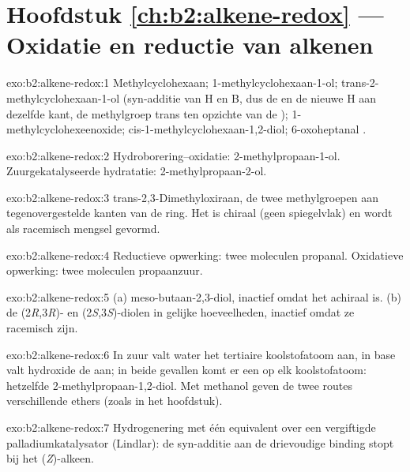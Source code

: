 \section*{Hoofdstuk \ref{ch:b2:alkene-redox} --- Oxidatie en reductie van alkenen}

\begin{solution}{exo:b2:alkene-redox:1}
Methylcyclohexaan; 1-methylcyclohexaan-1-ol; trans-2-methylcyclohexaan-1-ol (syn-additie van
H en B, dus de  en de nieuwe H aan dezelfde kant, de methylgroep trans ten opzichte van de );
1-methylcyclohexeenoxide; cis-1-methylcyclohexaan-1,2-diol; 6-oxoheptanal
.
\end{solution}

\begin{solution}{exo:b2:alkene-redox:2}
Hydroborering--oxidatie: 2-methylpropaan-1-ol. Zuurgekatalyseerde hydratatie:
2-methylpropaan-2-ol.
\end{solution}

\begin{solution}{exo:b2:alkene-redox:3}
trans-2,3-Dimethyloxiraan, de twee methylgroepen aan tegenovergestelde kanten van de ring. Het is chiraal (geen
spiegelvlak) en wordt als racemisch mengsel gevormd.
\end{solution}

\begin{solution}{exo:b2:alkene-redox:4}
Reductieve opwerking: twee moleculen propanal. Oxidatieve opwerking: twee moleculen
propaanzuur.
\end{solution}

\begin{solution}{exo:b2:alkene-redox:5}
(a) meso-butaan-2,3-diol, inactief omdat het achiraal is. (b) de
(2\textit{R},3\textit{R})- en (2\textit{S},3\textit{S})-diolen in gelijke hoeveelheden, inactief
omdat ze racemisch zijn.
\end{solution}

\begin{solution}{exo:b2:alkene-redox:6}
In zuur valt water het tertiaire koolstofatoom aan, in base valt hydroxide de  aan; in beide
gevallen komt er een  op elk koolstofatoom: hetzelfde 2-methylpropaan-1,2-diol. Met methanol geven de twee
routes verschillende ethers (zoals in het hoofdstuk).
\end{solution}

\begin{solution}{exo:b2:alkene-redox:7}
Hydrogenering met één equivalent  over een vergiftigde palladiumkatalysator
(Lindlar): de syn-additie aan de drievoudige binding stopt bij het (\textit{Z})-alkeen.
\end{solution}

